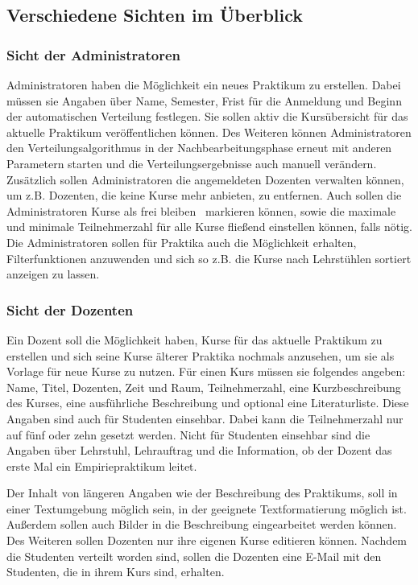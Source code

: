 		\subsection{Verschiedene Sichten im Überblick}
		\label{Sichten}
		
			\subsubsection{Sicht der Administratoren}
				Administratoren haben die Möglichkeit ein neues Praktikum zu erstellen.
				Dabei müssen sie Angaben über Name, Semester, Frist für die Anmeldung und Beginn der automatischen Verteilung festlegen.
				Sie sollen aktiv die Kursübersicht für das aktuelle Praktikum veröffentlichen können.
				Des Weiteren können Administratoren den Verteilungsalgorithmus in der Nachbearbeitungsphase erneut mit anderen Parametern starten und die Verteilungsergebnisse auch manuell verändern.
				Zusätzlich sollen Administratoren die angemeldeten Dozenten verwalten können, um z.B. Dozenten, die keine Kurse mehr anbieten, zu entfernen.
				Auch sollen die Administratoren Kurse als \glqq frei bleiben\grqq~ markieren können, sowie die maximale und minimale Teilnehmerzahl für alle Kurse fließend einstellen können, falls nötig.
				Die Administratoren sollen für Praktika auch die Möglichkeit erhalten, Filterfunktionen anzuwenden und sich so z.B. die Kurse nach Lehrstühlen sortiert anzeigen zu lassen.
			
			\subsubsection{Sicht der Dozenten}
				Ein Dozent soll die Möglichkeit haben, Kurse für das aktuelle Praktikum zu erstellen und sich seine Kurse älterer Praktika nochmals anzusehen, um sie als Vorlage für neue Kurse zu nutzen. 
				Für einen Kurs müssen sie folgendes angeben: Name, Titel, Dozenten, Zeit und Raum, Teilnehmerzahl, eine Kurzbeschreibung des Kurses, eine ausführliche Beschreibung und optional eine Literaturliste.
				Diese Angaben sind auch für Studenten einsehbar.
				Dabei kann die Teilnehmerzahl nur auf fünf oder zehn gesetzt werden.
				Nicht für Studenten einsehbar sind die Angaben über Lehrstuhl, Lehrauftrag und die Information, ob der Dozent das erste Mal ein Empiriepraktikum leitet.
				
				Der Inhalt von längeren Angaben wie der Beschreibung des Praktikums, soll in einer Textumgebung möglich sein, in der geeignete Textformatierung möglich ist.
				Außerdem sollen auch Bilder in die Beschreibung eingearbeitet werden können.
				Des Weiteren sollen Dozenten nur ihre eigenen Kurse editieren können.
				Nachdem die Studenten verteilt worden sind, sollen die Dozenten eine E-Mail mit den Studenten, die in ihrem Kurs sind, erhalten.
				
